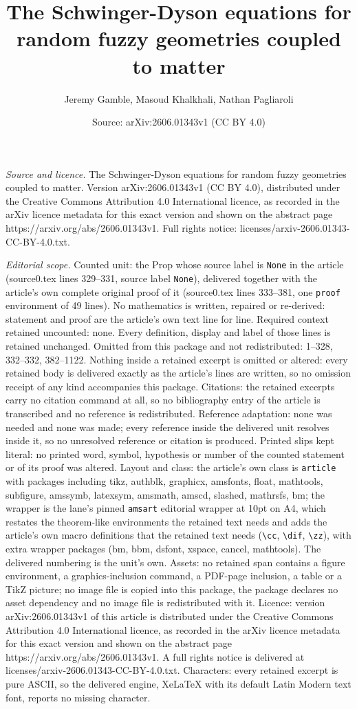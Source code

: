 \documentclass[10pt,a4paper]{amsart}
\title[The Schwinger-Dyson equations for random fuzzy geometries co]{The Schwinger-Dyson equations for random fuzzy geometries coupled to matter}
\author{Jeremy Gamble, Masoud Khalkhali, Nathan Pagliaroli}
\date{Source: arXiv:2606.01343v1 (CC BY 4.0)}
\begin{document}
\maketitle

\noindent\emph{Source and licence.} The Schwinger-Dyson equations for random fuzzy geometries coupled to matter. Version arXiv:2606.01343v1 (CC BY 4.0), distributed under the Creative Commons Attribution 4.0 International licence, as recorded in the arXiv licence metadata for this exact version and shown on the abstract page https://arxiv.org/abs/2606.01343v1. Full rights notice: licenses/arxiv-2606.01343-CC-BY-4.0.txt.\par\smallskip

\noindent\textit{Editorial scope.} Counted unit: the Prop whose source label is \texttt{None} in the article (source0.tex lines 329--331, source label \texttt{None}), delivered together with the article's own complete original proof of it (source0.tex lines 333--381, one \texttt{proof} environment of 49 lines). No mathematics is written, repaired or re-derived: statement and proof are the article's own text line for line. Required context retained uncounted: none. Every definition, display and label of those lines is retained unchanged. Omitted from this package and not redistributed: 1--328, 332--332, 382--1122. Nothing inside a retained excerpt is omitted or altered: every retained body is delivered exactly as the article's lines are written, so no omission receipt of any kind accompanies this package. Citations: the retained excerpts carry no citation command at all, so no bibliography entry of the article is transcribed and no reference is redistributed. Reference adaptation: none was needed and none was made; every reference inside the delivered unit resolves inside it, so no unresolved reference or citation is produced. Printed slips kept literal: no printed word, symbol, hypothesis or number of the counted statement or of its proof was altered. Layout and class: the article's own class is \texttt{article} with packages including tikz, authblk, graphicx, amsfonts, float, mathtools, subfigure, amssymb, latexsym, amsmath, amscd, slashed, mathrsfs, bm; the wrapper is the lane's pinned \texttt{amsart} editorial wrapper at 10pt on A4, which restates the theorem-like environments the retained text needs and adds the article's own macro definitions that the retained text needs (\texttt{\textbackslash cc}, \texttt{\textbackslash dif}, \texttt{\textbackslash zz}), with extra wrapper packages (bm, bbm, dsfont, xspace, cancel, mathtools). The delivered numbering is the unit's own. Assets: no retained span contains a figure environment, a graphics-inclusion command, a PDF-page inclusion, a table or a TikZ picture; no image file is copied into this package, the package declares no asset dependency and no image file is redistributed with it. Licence: version arXiv:2606.01343v1 of this article is distributed under the Creative Commons Attribution 4.0 International licence, as recorded in the arXiv licence metadata for this exact version and shown on the abstract page https://arxiv.org/abs/2606.01343v1. A full rights notice is delivered at licenses/arxiv-2606.01343-CC-BY-4.0.txt. Characters: every retained excerpt is pure ASCII, so the delivered engine, XeLaTeX with its default Latin Modern text font, reports no missing character.
\end{document}
